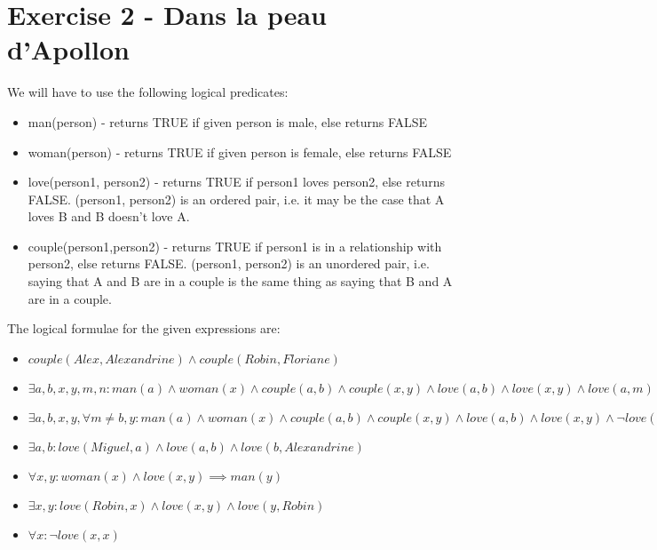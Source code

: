 \documentclass{article}
\begin{document}
\section{Exercise 2 - Dans la peau d'Apollon}
We will have to use the following logical predicates:
\begin{itemize}
\item {\selectfont
man(person)} - returns TRUE if given person is male, else returns FALSE
\item {\selectfont
woman(person)} - returns TRUE if given person is female, else returns FALSE
\item {\selectfont
love(person1, person2)} - returns TRUE if person1 loves person2, else returns FALSE. (person1, person2) is an ordered pair, i.e. it may be the case that A loves B and B doesn't love A.
\item {\selectfont
couple(person1,person2)} - returns TRUE if person1 is in a relationship with person2, else returns FALSE. (person1, person2) is an unordered pair, i.e. saying that A and B are in a couple is the same thing as saying that B and A are in a couple. 
\end{itemize}
The logical formulae for the given expressions are:
\begin{itemize}

\item \(couple(Alex, Alexandrine) \land couple(Robin, Floriane) \)

\item \( \exists a,b,x,y,m,n: man(a) \land woman(x) \land couple(a,b) \land couple(x,y) \land love(a,b) \land love(x,y) \land love(a,m) \land(x,n) \)

\item \( \exists a,b,x,y , \forall m \neq b,y: man(a) \land woman(x) \land couple(a,b) \land couple(x,y) \land love(a,b) \land love(x,y) \land \neg love(a,m) \land \neg love(x,m) \)

\item \( \exists a,b: love(Miguel,a) \land love(a,b) \land love(b,Alexandrine)\)

\item \( \forall x,y: woman(x) \land love(x,y) \implies man(y) \)

\item \( \exists x,y: love(Robin,x) \land love(x,y) \land love(y,Robin) \)

\item \( \forall x: \neg love(x,x) \)
\end{itemize}
\end{document}

